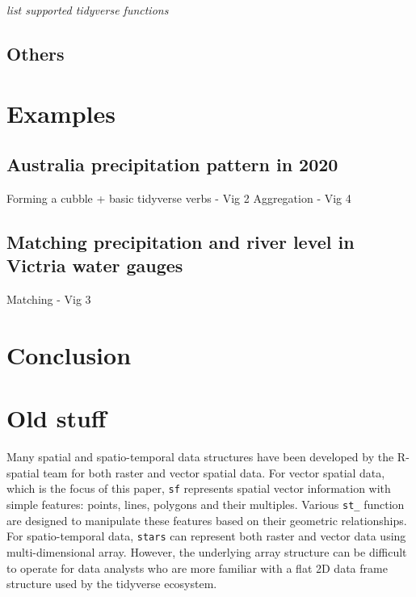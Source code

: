 \documentclass[
]{jss}
\begin{document}
\emph{list supported tidyverse functions}

\hypertarget{others}{%
\subsection{Others}\label{others}}

\newpage

\hypertarget{examples}{%
\section{Examples}\label{examples}}

\hypertarget{australia-precipitation-pattern-in-2020}{%
\subsection{Australia precipitation pattern in
2020}\label{australia-precipitation-pattern-in-2020}}

Forming a cubble + basic tidyverse verbs - Vig 2 Aggregation - Vig 4

\hypertarget{matching-precipitation-and-river-level-in-victria-water-gauges}{%
\subsection{Matching precipitation and river level in Victria water
gauges}\label{matching-precipitation-and-river-level-in-victria-water-gauges}}

Matching - Vig 3

\hypertarget{conclusion}{%
\section{Conclusion}\label{conclusion}}

\newpage

\hypertarget{old-stuff}{%
\section{Old stuff}\label{old-stuff}}

Many spatial and spatio-temporal data structures have been developed by
the R-spatial team for both raster and vector spatial data. For vector
spatial data, which is the focus of this paper, \texttt{sf}
\citep{pebesma2018simple} represents spatial vector information with
simple features: points, lines, polygons and their multiples. Various
\texttt{st\_} function are designed to manipulate these features based
on their geometric relationships. For spatio-temporal data,
\texttt{stars} \citep{stars} can represent both raster and vector data
using multi-dimensional array. However, the underlying array structure
can be difficult to operate for data analysts who are more familiar with
a flat 2D data frame structure used by the tidyverse ecosystem.
\end{document}

